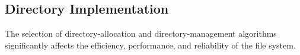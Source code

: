 \subsection{Directory Implementation}\label{subsec:Directory_Implementation}
The selection of directory-allocation and directory-management algorithms significantly affects the efficiency, performance, and reliability of the file system.


